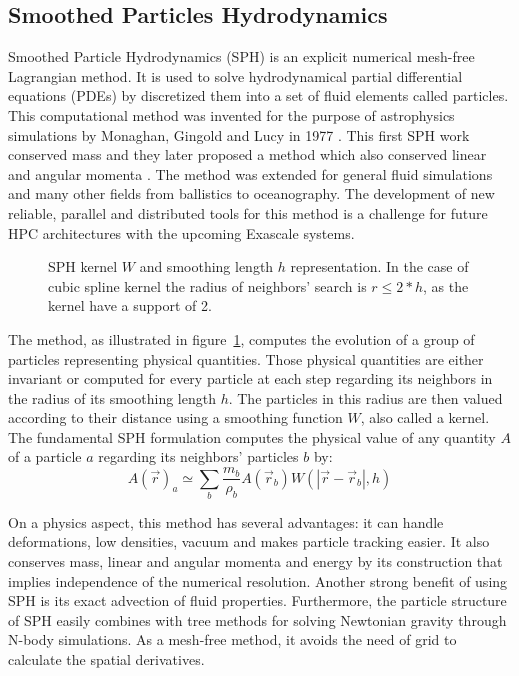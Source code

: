 \subsection{Smoothed Particles Hydrodynamics}
\label{sec:intro_sph}
Smoothed Particle Hydrodynamics (SPH) is an explicit numerical mesh-free Lagrangian method.
It is used to solve hydrodynamical partial differential equations (PDEs) by discretized them into a set of fluid elements called particles. 
This computational method was invented for the purpose of astrophysics simulations by Monaghan, Gingold and Lucy in 1977 \cite{lucy1977numerical,gingold1977smoothed}. 
This first SPH work conserved mass and they later proposed a method which also conserved linear and angular momenta \cite{gingold1982kernel}. 
The method was extended for general fluid simulations and many other fields from ballistics to oceanography.
The development of new reliable, parallel and distributed tools for this method is a challenge for future HPC architectures with the upcoming Exascale systems.

%
\begin{figure}
\centering

\caption[Smoothed Particle Hydrodynamics method schematic]{SPH kernel $W$ and smoothing length $h$ representation. In the case of cubic spline kernel the radius of neighbors' search is $r\leq2*h$, as the kernel have a support of 2.}
\label{fig:sph_base}
\end{figure}
%
The method, as illustrated in figure~\ref{fig:sph_base}, computes the evolution of a group of particles representing physical quantities.
Those physical quantities are either invariant or computed for every particle at each step regarding its neighbors in the radius of its smoothing length $h$. 
The particles in this radius are then valued according to their distance using a smoothing function $W$, also called a kernel. 
The fundamental SPH formulation computes the physical value of any quantity $A$ of a particle $a$ regarding its neighbors’ particles $b$ by:
\begin{equation}
A(\vec{r})_a \simeq \sum_b \frac{m_b}{\rho_b} A(\vec{r}_b) W ( |\vec{r}-\vec{r}_b|,h)
\end{equation}

On a physics aspect, this method has several advantages:
it can handle deformations, low densities, vacuum and makes particle tracking easier. 
It also conserves mass, linear and angular momenta and energy by its construction that implies independence of the numerical resolution. 
Another strong benefit of using SPH is its exact advection of fluid properties. 
Furthermore, the particle structure of SPH easily combines with tree methods for solving Newtonian gravity through N-body simulations.
As a mesh-free method, it avoids the need of grid to calculate the spatial derivatives. 

